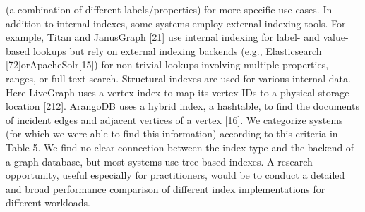 (a combination of different labels/properties) for more specific use cases. In addition to internal indexes, some systems employ external indexing tools. For example, Titan and JanusGraph [21] use internal indexing for label- and value-based lookups but rely on external indexing backends (e.g., Elasticsearch [72]orApacheSolr[15]) for non-trivial lookups involving multiple properties, ranges, or full-text search. Structural indexes are used for various internal data. Here LiveGraph uses a vertex index to map its vertex IDs to a physical storage location [212]. ArangoDB uses a hybrid index, a hashtable, to find the documents of incident edges and adjacent vertices of a vertex [16]. We categorize systems (for which we were able to find this information) according to this criteria in Table 5. We find no clear connection between the index type and the backend of a graph database, but most systems use tree-based indexes. A research opportunity, useful especially for practitioners, would be to conduct a detailed and broad performance comparison of different index implementations for different workloads.